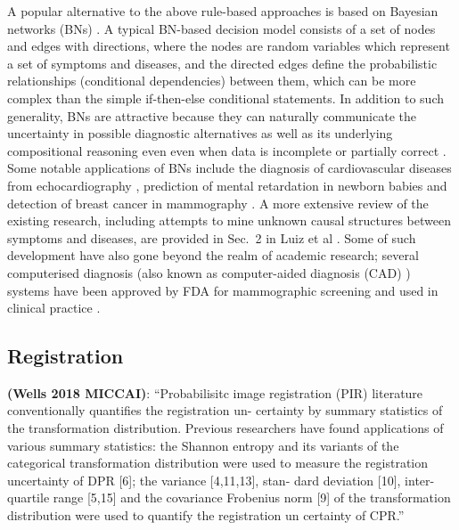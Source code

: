A popular alternative to the above rule-based approaches is based on Bayesian networks (BNs) \cite{pearl2014probabilistic}. A typical BN-based decision model consists of a set of nodes and edges with directions, where the nodes are random variables which represent a set of symptoms and diseases, and the directed edges define the probabilistic relationships (conditional dependencies) between them, which can be more complex than the simple if-then-else conditional statements. In addition to such generality, BNs are attractive because they can naturally communicate the uncertainty in possible diagnostic alternatives as well as its underlying compositional reasoning even even when data is incomplete or partially correct \cite{nikovski2000constructing}. Some notable applications of BNs include the diagnosis of cardiovascular diseases from echocardiography \cite{diez1997diaval}, prediction of mental retardation in newborn babies \cite{mani1997mentor} and detection of breast cancer in mammography \cite{kahn1997construction,sajda2003multi}. A more extensive review of the existing research, including attempts to mine unknown causal structures between symptoms and diseases, are provided in Sec.~2 in Luiz et al \cite{seixas2014bayesian}. Some of such development have also gone beyond the realm of academic research; several computerised diagnosis (also known as computer-aided diagnosis (CAD) \cite{doi1993digital}) systems have been approved by FDA for mammographic screening  and used in clinical practice \cite{sajda2006machine}. 







\subsection{Registration}
\textbf{(Wells 2018 MICCAI)}: ``Probabilisitc image registration (PIR) literature conventionally quantifies the registration un- certainty by summary statistics of the transformation distribution. Previous researchers have found applications of various summary statistics: the Shannon entropy and its variants of the categorical transformation distribution were used to measure the registration uncertainty of DPR [6]; the variance [4,11,13], stan- dard deviation [10], inter-quartile range [5,15] and the covariance Frobenius norm [9] of the transformation distribution were used to quantify the registration un	certainty of CPR.''

